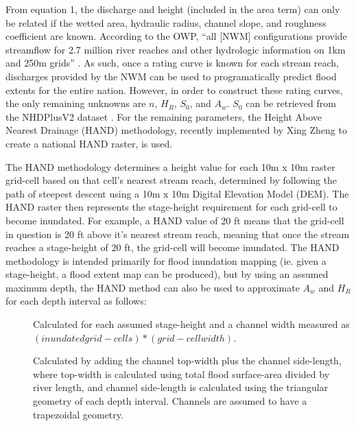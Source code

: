 \documentclass[11pt]{article}
\begin{document}
From equation 1, the discharge and height (included in the area term) can only be related if the wetted area, hydraulic radius, channel slope, and roughness coefficient are known. According to the OWP, ``all [NWM] configurations provide streamflow for 2.7 million river reaches and other hydrologic information on 1km and 250m grids'' \cite{nwmsummary}. As such, once a rating curve is known for each stream reach, discharges provided by the NWM can be used to programatically predict flood extents for the entire nation. However, in order to construct these rating curves, the only remaining unknowns are $n$, $H_R$, $S_0$, and $A_w$. $S_0$ can be retrieved from the NHDPlusV2 dataset \cite{nhdplusv2}. For the remaining parameters, the Height Above Nearest Drainage (HAND) methodology, recently implemented by Xing Zheng to create a national HAND raster, is used. 

The HAND methodology determines a height value for each 10m x 10m raster grid-cell based on that cell's nearest stream reach, determined by following the path of steepest descent using a 10m x 10m Digital Elevation Model (DEM). The HAND raster then represents the stage-height requirement for each grid-cell to become inundated. For example, a HAND value of 20 ft means that the grid-cell in question is 20 ft above it's nearest stream reach, meaning that once the stream reaches a stage-height of 20 ft, the grid-cell will become inundated. The HAND methodology is intended primarily for flood inundation mapping (ie. given a stage-height, a flood extent map can be produced), but by using an assumed maximum depth, the HAND method can also be used to approximate $A_w$ and $H_R$ for each depth interval as follows: 

\begin{description}
  \item[] Calculated for each assumed stage-height and a channel width measured as $(inundated grid-cells)*(grid-cell width)$.
  \item[] Calculated by adding the channel top-width plus the channel side-length, where top-width is calculated using total flood surface-area divided by river length, and channel side-length is calculated using the triangular geometry of each depth interval. Channels are assumed to have a trapezoidal geometry. 
\end{description}
\end{document}
